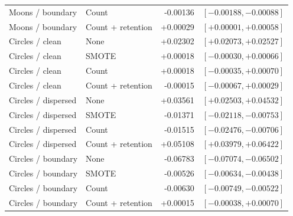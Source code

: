 \begin{table}[htbp]
\begin{tabular}{llrr}
Moons / boundary & Count & -0.00136 & $[-0.00188, -0.00088]$ \\
Moons / boundary & Count + retention & +0.00029 & $[+0.00001, +0.00058]$ \\
Circles / clean & None & +0.02302 & $[+0.02073, +0.02527]$ \\
Circles / clean & SMOTE & +0.00018 & $[-0.00030, +0.00066]$ \\
Circles / clean & Count & +0.00018 & $[-0.00035, +0.00070]$ \\
Circles / clean & Count + retention & -0.00015 & $[-0.00067, +0.00029]$ \\
Circles / dispersed & None & +0.03561 & $[+0.02503, +0.04532]$ \\
Circles / dispersed & SMOTE & -0.01371 & $[-0.02118, -0.00753]$ \\
Circles / dispersed & Count & -0.01515 & $[-0.02476, -0.00706]$ \\
Circles / dispersed & Count + retention & +0.05108 & $[+0.03979, +0.06422]$ \\
Circles / boundary & None & -0.06783 & $[-0.07074, -0.06502]$ \\
Circles / boundary & SMOTE & -0.00526 & $[-0.00634, -0.00438]$ \\
Circles / boundary & Count & -0.00630 & $[-0.00749, -0.00522]$ \\
Circles / boundary & Count + retention & +0.00015 & $[-0.00038, +0.00070]$ \\
\hline
\end{tabular}
\end{table}
\clearpage
